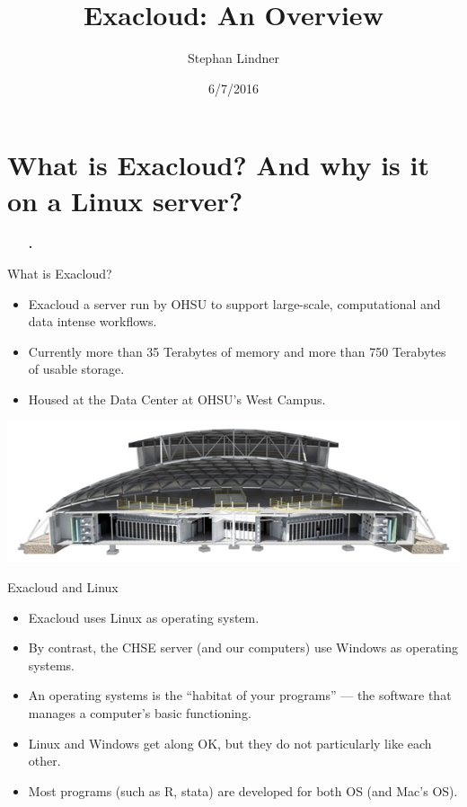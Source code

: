 \documentclass[12pt,t,xcolor=table]{beamer}
\author{Stephan Lindner}
\date{6/7/2016}
\title{Exacloud: An Overview}
\begin{document}
\maketitle

\section{What is Exacloud? And why is it on a Linux server?}
\label{sec:orgheadline5}
\begin{frame}[c]{}
  \begin{itemize}
    \item[\bf\thesection.] \bf\insertsection
  \end{itemize}          
\end{frame}

\begin{frame}[label={sec:orgheadline1}]{What is Exacloud?}
\begin{itemize}
\item Exacloud a server run by OHSU to support large-scale, computational and data intense workflows.

\item Currently more than 35 Terabytes of memory and more than 750 Terabytes of usable storage.

\item Housed at the Data Center at OHSU's West Campus.
\end{itemize}

\vspace{1em}
\begin{center}
  \includegraphics[width=.8\textwidth]{Figures/ohsu-datacenter.png}
\end{center}
\end{frame}


\begin{frame}[label={sec:orgheadline2}]{Exacloud and Linux}
\begin{itemize}
\item Exacloud uses Linux as operating system.

\item By contrast, the CHSE server (and our computers) use Windows as operating systems.

\item An operating systems is the ``habitat of your programs'' --- the software that manages a computer's basic functioning.

\item Linux and Windows get along OK, but they do not particularly like each other.

\item Most programs (such as R, stata) are developed for both OS (and Mac's OS).
\end{itemize}
\end{frame}
\end{document}
